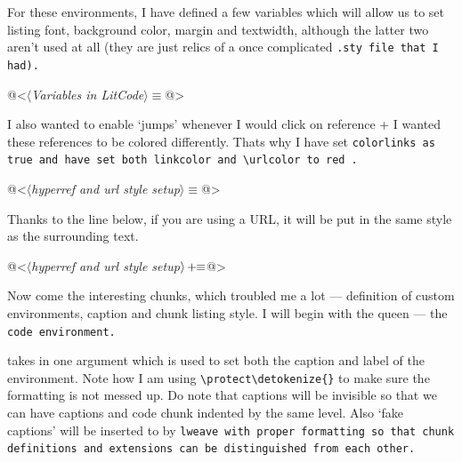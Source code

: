 For these environments, I have defined a few variables which will allow us to set listing font, background
color, margin and textwidth, although the latter two aren't used at all (they are just relics of a once
complicated \tt .sty \rm file that I had). 

\begin{code}
@<$\langle$\textit{Variables in LitCode}$\rangle\equiv$@>
\def\litcode{{LitCode}}
\def\linewidth{\textwidth}

\def\xleftmargin{10pt}
\def\xrightmargin{0pt}

\def\litcodefont{\fontfamily{SourceCodePro-TLF}\small}
\def\codebg{yellow!15}
\def\vcodebg{green!20}

\end{code}

I also wanted to enable `jumps' whenever I would click on reference + I wanted these references to be colored
differently. Thats why I have set \tt colorlinks \rm as \tt true \rm and have set both \tt linkcolor \rm and
\verb|\urlcolor| \rm to \tt red \rm. 

\begin{code}
@<$\langle$\textit{hyperref and url style setup}$\rangle\equiv$@>
\hypersetup{
    colorlinks=true,
    linkcolor=red,
    urlcolor=red,
    citecolor=red
}

\end{code}

Thanks to the line below, if you are using a URL, it will be put in the same style as the surrounding text.
\begin{oldcode}
@<$\langle$\textit{hyperref and url style setup}$\rangle \thinspace +\!\!\equiv$@>
\end{oldcode}

Now come the interesting chunks, which troubled me a lot --- definition of custom environments, caption and
chunk listing style. I will begin with the queen --- the \tt code \rm environment.

\begin{code}[code environment]
@<$\langle$\textit{code environment}$\rangle\equiv$@>
[1][]{
    \lstset{
\end{code}

 takes in one argument which is used to set both the caption and label of the environment.
Note how I am using \verb|\protect\detokenize{}| to make sure the formatting is not messed up. Do note that
captions will be invisible so that we can have captions and code chunk indented by the same level. Also `fake
captions' will be inserted to by \tt lweave \rm with proper formatting so that chunk definitions and
extensions can be distinguished from each other.

